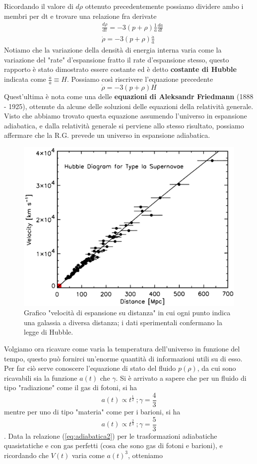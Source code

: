 \documentclass[
10pt, %
a4paper, %
oneside, %
headinclude,footinclude, %
BCOR5mm, %
]{scrartcl}
\begin{document}
Ricordando il valore di $d\rho$ ottenuto precedentemente possiamo dividere ambo i membri per dt e trovare una relazione fra derivate
\begin{align*}
	&\frac{d\rho}{dt} = -3(p + \rho)\frac{1}{a}\frac{da}{dt}\\\
	&\dot{\rho} = -3(p + \rho)\frac{\dot{a}}{a}
\end{align*}
Notiamo che la variazione della densità di energia interna varia come la variazione del "rate" d'espansione fratto il rate d'espansione stesso, questo rapporto è stato dimostrato essere costante ed è detto \textbf{costante di Hubble} indicata come \(\frac{\dot{a}}{a}\equiv H\).  Possiamo così riscrivere l'equazione precedente
\[\dot{\rho} = -3(p+\rho) H\]
Quest'ultima è nota come una delle \textbf{equazioni di Aleksandr Friedmann} (1888 - 1925), ottenute da alcune delle soluzioni delle equazioni della relatività generale. Visto che abbiamo trovato questa equazione assumendo l'universo in espansione adiabatica, e dalla relatività generale si perviene allo stesso risultato, possiamo affermare che la R.G. prevede un universo in espansione adiabatica. 
\begin{figure}[h!]
	\centering
	\includegraphics[width=0.6\linewidth]{../images/Hubble}
	\caption{Grafico "velocità di espansione su distanza" in cui ogni punto indica una galassia a diversa distanza; i dati sperimentali confermano la legge di Hubble.}
	\label{fig:hubble}
\end{figure}
\FloatBarrier
Volgiamo ora ricavare come varia la temperatura dell'universo in funzione del tempo, questo può fornirci un'enorme quantità di informazioni utili su di esso.\\
Per far ciò serve conoscere l'equazione di stato del fluido \(p(\rho)\), da cui sono ricavabili sia la funzione \(a(t)\) che $\gamma$. Si è arrivato a sapere che per un fluido di tipo "radiazione" come il gas di fotoni, si ha \[a(t)\propto t^{\frac{1}{2}}\ ; \gamma = \frac{4}{3}\] mentre per uno di tipo "materia" come per i barioni, si ha \[a(t)\propto t^{\frac{2}{3}}\ ; \gamma =\frac{5}{3}\]. Data la relazione (\ref{eq:adiabatica2}) per le trasformazioni adiabatiche quasistatiche e con gas perfetti (cosa che sono gas di fotoni e barioni), e ricordando che \(V(t)\) varia come \(a(t)^3\), otteniamo
\end{document}
